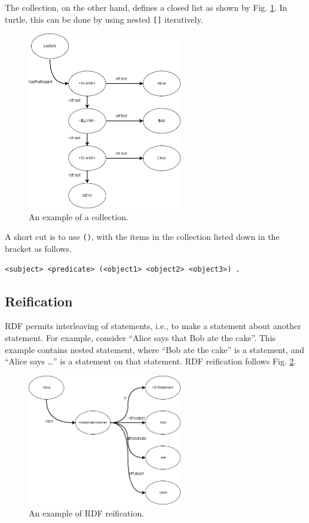 The collection, on the other hand, defines a closed list as shown by Fig. \ref{fig:lectureexp4}. In turtle, this can be done by using nested \verb|[]| iteratively. 
\begin{figure}[htbp]
	\centering
	\includegraphics[width=0.6\textwidth]{./chapters/ch-semanticwebarchitecture/figures/lectureexp4.png}
	\caption{An example of a collection.}
	\label{fig:lectureexp4}
\end{figure}
A short cut is to use \verb|()|, with the items in the collection listed down in the bracket as follows.
\begin{lstlisting}
<subject> <predicate> (<object1> <object2> <object3>) .
\end{lstlisting}

\subsection{Reification}

RDF permits interleaving of statements, i.e., to make a statement about another statement. For example, consider ``Alice says that Bob ate the cake''. This example contains nested statement, where ``Bob ate the cake'' is a statement, and ``Alice says \ldots'' is a statement on that statement. RDF reification follows Fig. \ref{fig:reificationexp}.
\begin{figure}[htbp]
	\centering
	\includegraphics[width=0.6\textwidth]{./chapters/ch-semanticwebarchitecture/figures/reificationexp.png}
	\caption{An example of RDF reification.}
	\label{fig:reificationexp}
\end{figure}

